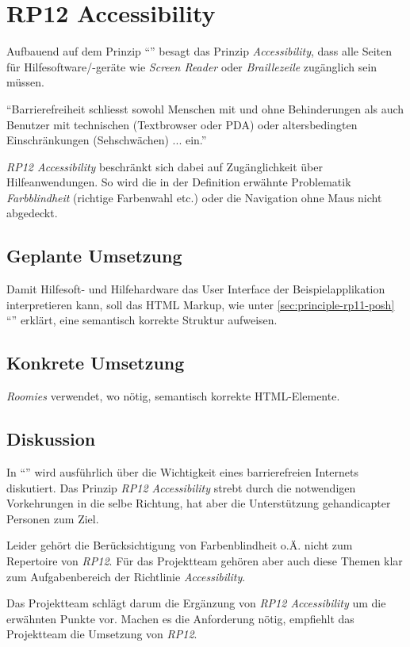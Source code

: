 \section{RP12 Accessibility}
\label{sec:principle-rp12-accessibility}
Aufbauend auf dem Prinzip ``'' besagt das Prinzip \emph{Accessibility}, dass alle Seiten für Hilfesoftware/-geräte wie \emph{Screen Reader} oder \emph{Braillezeile} zugänglich sein müssen.


``Barrierefreiheit schliesst sowohl Menschen mit und ohne Behinderungen als auch Benutzer mit technischen (Textbrowser oder PDA) oder altersbedingten Einschränkungen (Sehschwächen) ... ein.'' \cite{BarrierefreiesInternet}

\emph{RP12 Accessibility} beschränkt sich dabei auf Zugänglichkeit über Hilfeanwendungen. So wird die in der Definition erwähnte Problematik \emph{Farbblindheit} (richtige Farbenwahl etc.) oder die Navigation ohne Maus nicht abgedeckt.

\subsection*{Geplante Umsetzung}
Damit Hilfesoft- und Hilfehardware das User Interface der Beispielapplikation interpretieren kann, soll das HTML Markup, wie unter \ref{sec:principle-rp11-posh} ``'' erklärt, eine semantisch korrekte Struktur aufweisen.

\subsection*{Konkrete Umsetzung}

\emph{Roomies} verwendet, wo nötig, semantisch korrekte HTML-Elemente.

\subsection*{Diskussion}
In ``'' wird ausführlich über die Wichtigkeit eines barrierefreien Internets diskutiert. Das Prinzip \emph{RP12 Accessibility} strebt durch die notwendigen Vorkehrungen in die selbe Richtung, hat aber die Unterstützung gehandicapter Personen zum Ziel.

Leider gehört die Berücksichtigung von Farbenblindheit o.Ä. nicht zum Repertoire von \emph{RP12}. Für das Projektteam gehören aber auch diese Themen klar zum Aufgabenbereich der Richtlinie \emph{Accessibility}.

Das Projektteam schlägt darum die Ergänzung von \emph{RP12 Accessibility} um die erwähnten Punkte vor. Machen es die Anforderung nötig, empfiehlt das Projektteam die Umsetzung von \emph{RP12}.